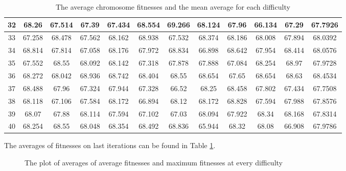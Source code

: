 \documentclass[10pt]{article}
\begin{document}
\begin{table}[t]
\begin{center}
\begin{tabular}{|c|c|c|c|c|c|c|c|c|c|c|c|}
            32 & 68.26 & 67.514 & 67.39 & 67.434 & 68.554 & 69.266 & 68.124 & 67.96 & 66.134 & 67.29 & 67.7926\\\hline
            33 & 67.258 & 68.478 & 67.562 & 68.162 & 68.938 & 67.532 & 68.374 & 68.186 & 68.008 & 67.894 & 68.0392\\\hline
            34 & 68.814 & 67.814 & 67.058 & 68.176 & 67.972 & 68.834 & 66.898 & 68.642 & 67.954 & 68.414 & 68.0576\\\hline
            35 & 67.552 & 68.55 & 68.092 & 68.142 & 67.318 & 67.878 & 67.888 & 67.084 & 68.254 & 68.97 & 67.9728\\\hline
            36 & 68.272 & 68.042 & 68.936 & 68.742 & 68.404 & 68.55 & 68.654 & 67.65 & 68.654 & 68.63 & 68.4534\\\hline
            37 & 68.488 & 67.96 & 67.324 & 67.944 & 67.328 & 66.52 & 68.25 & 68.458 & 67.802 & 67.434 & 67.7508\\\hline
            38 & 68.118 & 67.106 & 67.584 & 68.172 & 66.894 & 68.12 & 68.172 & 68.828 & 67.594 & 67.988 & 67.8576\\\hline
            39 & 68.07 & 67.88 & 68.114 & 67.594 & 67.102 & 67.03 & 68.094 & 67.922 & 68.34 & 68.168 & 67.8314\\\hline
            40 & 68.254 & 68.55 & 68.048 & 68.354 & 68.492 & 68.836 & 65.944 & 68.32 & 68.08 & 66.908 & 67.9786\\\hline
        \end{tabular}
    \end{center}
    \caption{The average chromosome fitnesses and the mean average for each difficulty}\label{tableavg}
\end{table}

The averages of fitnesses on last iterations can be found in Table \ref{tableavg}.

\begin{figure}[t]
    \begin{center}

    \end{center}
    \caption{The plot of averages of average fitnesses and maximum fitnesses at every difficulty}
\end{figure}
\end{document}
